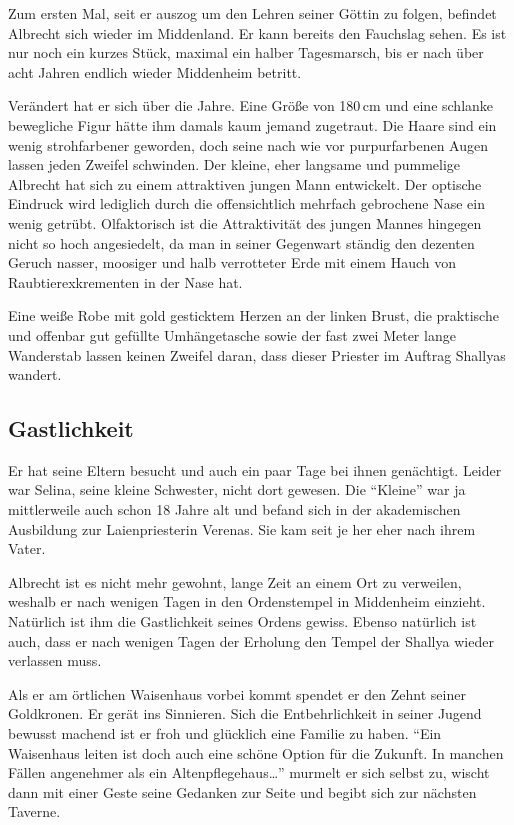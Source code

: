 Zum ersten Mal, seit er auszog um den Lehren seiner Göttin zu folgen, befindet Albrecht sich wieder im Middenland. Er kann bereits den Fauchslag sehen. Es ist nur noch ein kurzes Stück, maximal ein halber Tagesmarsch, bis er nach über acht Jahren endlich wieder Middenheim betritt.

Verändert hat er sich über die Jahre. Eine Größe von 180\,cm und eine schlanke bewegliche Figur hätte ihm damals kaum jemand zugetraut. Die Haare sind ein wenig strohfarbener geworden, doch seine nach wie vor purpurfarbenen Augen lassen jeden Zweifel schwinden. Der kleine, eher langsame und pummelige Albrecht hat sich zu einem attraktiven jungen Mann entwickelt. Der optische Eindruck wird lediglich durch die offensichtlich mehrfach gebrochene Nase ein wenig getrübt. Olfaktorisch ist die Attraktivität des jungen Mannes hingegen nicht so hoch angesiedelt, da man in seiner Gegenwart ständig den dezenten Geruch nasser, moosiger und halb verrotteter Erde mit einem Hauch von Raubtierexkrementen in der Nase hat.

Eine weiße Robe mit gold gesticktem Herzen an der linken Brust, die praktische und offenbar gut gefüllte Umhängetasche sowie der fast zwei Meter lange Wanderstab lassen keinen Zweifel daran, dass dieser Priester im Auftrag Shallyas wandert. 

\subsection*{Gastlichkeit}
Er hat seine Eltern besucht und auch ein paar Tage bei ihnen genächtigt. Leider war Selina, seine kleine Schwester, nicht dort gewesen. Die \enquote{Kleine} war ja mittlerweile auch schon 18 Jahre alt und befand sich in der akademischen Ausbildung zur Laienpriesterin Verenas. Sie kam seit je her eher nach ihrem Vater.

Albrecht ist es nicht mehr gewohnt, lange Zeit an einem Ort zu verweilen, weshalb er nach wenigen Tagen in den Ordenstempel in Middenheim einzieht.
Natürlich ist ihm die Gastlichkeit seines Ordens gewiss. Ebenso natürlich ist auch, dass er nach wenigen Tagen der Erholung den Tempel der Shallya wieder verlassen muss. 

Als er am örtlichen Waisenhaus vorbei kommt spendet er den Zehnt seiner Goldkronen. 
Er gerät ins Sinnieren. Sich die Entbehrlichkeit in seiner Jugend bewusst machend ist er froh und glücklich eine Familie zu haben. \enquote{Ein Waisenhaus leiten ist doch auch eine schöne Option für die Zukunft. In manchen Fällen angenehmer als ein Altenpflegehaus…} murmelt er sich selbst zu, wischt dann mit einer Geste seine Gedanken zur Seite und begibt sich zur nächsten Taverne.


